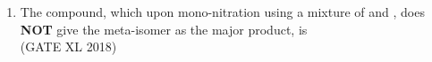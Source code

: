 \documentclass[14pt]{extarticle}
\begin{document}
\begin{flushleft}
\begin{enumerate}
\item The compound, which upon mono-nitration using a mixture of  and , does \textbf{NOT} give the meta-isomer as the major product, is \\
\hfill (GATE XL 2018)\\
\begin{enumerate}[label=(\Alph*)]
\end{enumerate}


\end{enumerate}
\end{flushleft}
\end{document}
